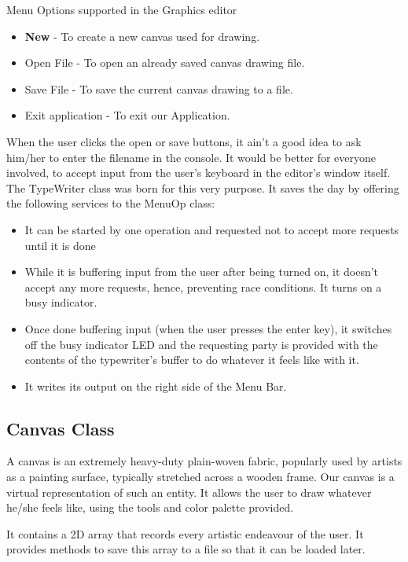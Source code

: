 \documentclass[12pt]{report}
\begin{document}
Menu Options supported in the Graphics editor
\begin{itemize}
\item{}\textbf{New} - To create a new canvas used for drawing.
\item{}Open File - To open an already saved canvas drawing file.
\item{}Save File - To save the current canvas drawing to a file.
\item{}Exit application - To exit our Application.
\end{itemize}


When the user clicks the open or save buttons, it ain't a good idea to ask him/her to enter the filename in the console. It would be better for everyone involved, to accept input from the user's keyboard in the editor's window itself. The TypeWriter class was born for this very purpose. It saves the day by offering the following services to the MenuOp class:
\begin{itemize}


\item{It can be started by one operation and requested not to accept more requests until it is done}
\item{While it is buffering input from the user after being turned on, it doesn't accept any more requests, hence, preventing race conditions. It turns on a busy indicator.}
\item{Once done buffering input (when the user presses the enter key), it switches off the busy indicator LED and the requesting party is provided with the contents of the typewriter's buffer to do whatever it feels like with it.}
\item{It writes its output on the right side of the Menu Bar.}

\end{itemize}



\subsection{Canvas Class}

A canvas  is an extremely heavy-duty plain-woven fabric, popularly used by artists as a painting surface, typically stretched across a wooden frame. Our canvas is a virtual representation of such an entity. It allows the user to draw whatever he/she feels like, using the tools and color palette provided.

It contains a 2D array that records every artistic endeavour of the user. It provides methods to save this array to a file so that it can be loaded later. 
\end{document}
